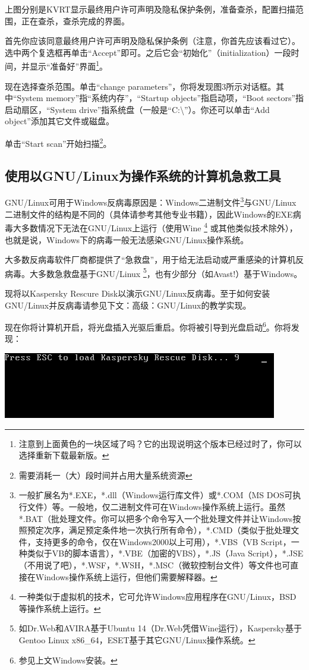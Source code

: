 \documentclass{book}
\begin{document}
上图分别是KVRT显示最终用户许可声明及隐私保护条例，准备查杀，配置扫描范围，正在查杀，查杀完成的界面。\par
首先你应该同意最终用户许可声明及隐私保护条例（注意，你首先应该看过它）。选中两个复选框再单击“Accept”即可。之后它会“初始化”（initialization）一段时间，并显示“准备好”界面\footnote{注意到上面黄色的一块区域了吗？它的出现说明这个版本已经过时了，你可以选择重新下载最新版。}。\par
现在选择查杀范围。单击“change parameters”，你将发现图3所示对话框。其中“System memory”指“系统内存”，“Startup objects”指启动项，“Boot sectors”指启动扇区，“System drive”指系统盘（一般是“C:\textbackslash”）。你还可以单击“Add object”添加其它文件或磁盘。\par
单击“Start scan”开始扫描\footnote{需要消耗一（大）段时间并占用大量系统资源}。
\subsection{使用以GNU/Linux为操作系统的计算机急救工具}
GNU/Linux可用于Windows反病毒原因是：Windows二进制文件\footnote{一般扩展名为*.EXE，*.dll（Windows运行库文件）或*.COM（MS DOS可执行文件）等。一般地，仅二进制文件可在Windows操作系统上运行。虽然*.BAT（批处理文件。你可以把多个命令写入一个批处理文件并让Windows按照预定次序，满足预定条件地一次执行所有命令），*.CMD（类似于批处理文件，支持更多的命令，仅在Windows2000以上可用），*.VBS（VB Script，一种类似于VB的脚本语言），*.VBE（加密的VBS），*.JS（Java Script），*.JSE（不用说了吧），*.WSF，*.WSH，*.MSC（微软控制台文件）等文件也可直接在Windows操作系统上运行，但他们需要解释器。}与GNU/Linux二进制文件的结构是不同的（具体请参考其他专业书籍），因此Windows的EXE病毒大多数情况下无法在GNU/Linux上运行（使用Wine \footnote{一种类似于虚拟机的技术，它可允许Windows应用程序在GNU/Linux，BSD等操作系统上运行。} 或其他类似技术除外），也就是说，Windows下的病毒一般无法感染GNU/Linux操作系统。\par
大多数反病毒软件厂商都提供了“急救盘”，用于给无法启动或严重感染的计算机反病毒。大多数急救盘基于GNU/Linux \footnote{如Dr.Web和AVIRA基于Ubuntu 14（Dr.Web凭借Wine运行），Kaspersky基于Gentoo Linux x86\_64，ESET基于其它GNU/Linux操作系统。}，也有少部分（如Avast!）基于Windows。\par
现将以Kaspersky Rescure Disk以演示GNU/Linux反病毒。至于如何安装GNU/Linux并反病毒请参见下文：高级：GNU/Linux的教学实现。\par
现在你将计算机开启，将光盘插入光驱后重启。你将被引导到光盘启动\footnote{参见上文Windows安装。}。你将发现：
\begin{center}
	\includegraphics[scale=0.7]{pic/krd1}
\end{center}
\end{document}

